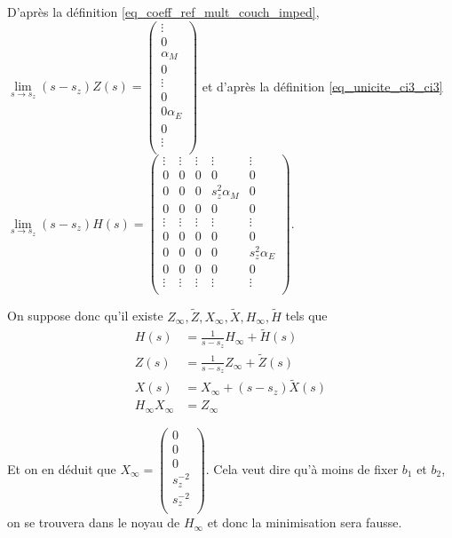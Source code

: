 D'après la définition \eqref{eq_coeff_ref_mult_couch_imped}, $\lim\limits_{s\rightarrow s_z} (s-s_z) Z(s) 
= \begin{pmatrix}
  \vdots \\
  0\\
  \alpha_{M}\\
  0 \\
  \vdots\\
  0 \\
  0 \alpha_{E} \\
  0 \\
  \vdots \\
\end{pmatrix}$ et d'après la définition \eqref{eq_unicite_ci3_ci3} $\lim\limits_{s\rightarrow s_z} (s-s_z)H(s) =
\begin{pmatrix}
  \vdots & \vdots & \vdots & \vdots &\vdots \\
  0 & 0 & 0 & 0 & 0 \\
  0 & 0 & 0 & s_z^2 \alpha_{M} & 0 \\
  0 & 0 & 0 & 0 & 0 \\
  \vdots & \vdots & \vdots & \vdots &\vdots \\
  0 & 0 & 0 & 0 & 0 \\
  0 & 0 & 0 & 0 & s_z^2 \alpha_{E} \\
  0 & 0 & 0 & 0 & 0 \\
  \vdots & \vdots & \vdots & \vdots &\vdots \\
\end{pmatrix}$.


On suppose donc qu'il existe $Z_\infty, \tilde{Z},X_\infty, \tilde{X},H_\infty, \tilde{H}$ tels que
\begin{align*}
H(s) &= \frac{1}{s-s_z}H_\infty + \tilde{H}(s) \\
Z(s) &= \frac{1}{s-s_z}Z_\infty + \tilde{Z}(s) \\
X(s) &= X_\infty + (s-s_z)\tilde{X}(s) \\
H_\infty X_\infty &= Z_\infty
\end{align*}

Et on en déduit que $X_\infty = \begin{pmatrix}
  0\\
  0\\
  0\\
  s_z^{-2}\\
  s_z^{-2}\\
  \end{pmatrix}$. Cela veut dire qu'à moins de fixer $b_1$ et $b_2$, on se trouvera dans le noyau de $H_\infty$ et donc la minimisation sera fausse.

